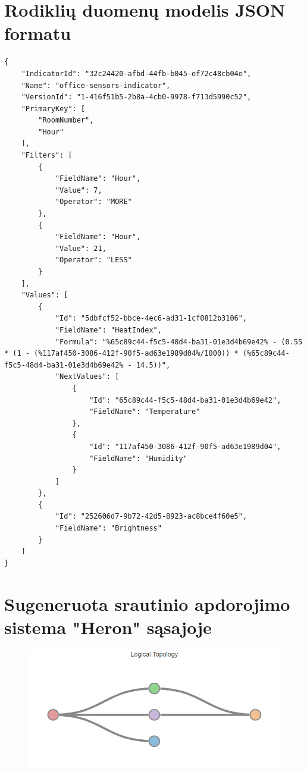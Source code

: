 \documentclass{VUMIFPSbakalaurinis}
\begin{document}
\section{Rodiklių duomenų modelis JSON formatu}\label{add:initial-json}
\begin{lstlisting}
{
    "IndicatorId": "32c24420-afbd-44fb-b045-ef72c48cb04e",
    "Name": "office-sensors-indicator",
    "VersionId": "1-416f51b5-2b8a-4cb0-9978-f713d5990c52",
    "PrimaryKey": [
        "RoomNumber",
        "Hour"
    ],
    "Filters": [
        {
            "FieldName": "Hour",
            "Value": 7,
            "Operator": "MORE"
        },
        {
            "FieldName": "Hour",
            "Value": 21,
            "Operator": "LESS"
        }
    ],
    "Values": [
        {
            "Id": "5dbfcf52-bbce-4ec6-ad31-1cf0812b3106",
            "FieldName": "HeatIndex",
            "Formula": "%65c89c44-f5c5-48d4-ba31-01e3d4b69e42% - (0.55 * (1 - (%117af450-3086-412f-90f5-ad63e1989d04%/1000)) * (%65c89c44-f5c5-48d4-ba31-01e3d4b69e42% - 14.5))",
            "NextValues": [
                {
                    "Id": "65c89c44-f5c5-48d4-ba31-01e3d4b69e42",
                    "FieldName": "Temperature"
                },
                {
                    "Id": "117af450-3086-412f-90f5-ad63e1989d04",
                    "FieldName": "Humidity"
                }
            ]
        },
        {
            "Id": "252606d7-9b72-42d5-8923-ac8bce4f60e5",
            "FieldName": "Brightness"
        }
    ]
}
\end{lstlisting}

\section{Sugeneruota srautinio apdorojimo sistema "Heron" sąsajoje}\label{add:generated-system1}
\begin{figure}[H]
    \centering
    \includegraphics[width=1\textwidth]{img/generated-topology-1.png}
    \label{img:generated-data}
\end{figure}
\end{document}
